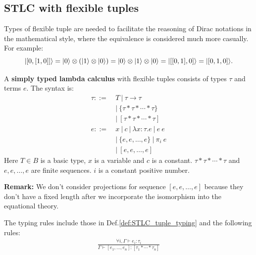 

\subsection{STLC with flexible tuples}

Types of flexible tuple are needed to facilitate the reasoning of Dirac notations in the mathematical style, where the equivalence is considered much more casually. For example:
$$
|[0,[1,0]]\rangle = |0\rangle \otimes (|1\rangle \otimes |0\rangle) = |0\rangle \otimes |1\rangle \otimes |0\rangle = |[[0, 1], 0]\rangle = |[0, 1, 0]\rangle.
$$

\begin{definition}
  A \textbf{simply typed lambda calculus} with flexible tuples consists of types $\tau$ and terms $e$. The syntax is:
  \begin{align*}
      \tau ::=&\ T\ |\ \tau \to \tau\\
        &\ |\ \{ \tau * \tau * \cdots * \tau \} \\
        &\ |\ [ \tau * \tau * \cdots * \tau ] \\
      e ::=&\ x\ |\ c\ |\ \lambda x : \tau. e\ |\ e\ e\\
        &\ |\ \{ e, e, \dots, e \}\ |\ \pi_i\ e \\
        &\ |\ [ e, e, \dots, e ]
  \end{align*}
  Here $T \in B$ is a basic type, $x$ is a variable and $c$ is a constant.
  $\tau * \tau * \cdots * \tau$ and $e, e, \dots, e$ are finite sequences. $i$ is a constant positive number.
\end{definition}

\textbf{Remark: }We don't consider projections for sequence $[ e, e, \dots, e ]$ because they don't have a fixed length after we incorporate the isomorphism into the equational theory.



\begin{definition}
  \label{def:STLC_flexible_tuple_typing}
  The typing rules include those in Def.\ref{def:STLC_tuple_typing} and the following rules:
  \begin{gather*}
      \frac{\forall i, \Gamma \vdash e_i : \tau_i}{\Gamma \vdash [e_1, \dots, e_n ] : [ \tau_1 * \cdots * \tau_n ]}
  \end{gather*}
\end{definition}

